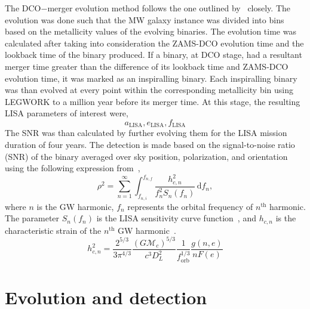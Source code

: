 \documentclass[journal, twocolumn]{IEEEtran}
\newcommand{\semaxis}[1]{a_{\text{#1}}}
\newcommand{\ecc}[1]{e_\text{#1}}
\begin{document}
    The DCO$-$merger evolution method follows the one outlined by~\cite{wagg2021gravitational} closely.
    The evolution was done such that the MW galaxy instance was divided into bins based on the metallicity values of the evolving binaries.
    The evolution time was calculated after taking into consideration the ZAMS-DCO evolution time and the lookback time of the binary produced.
    If a binary, at DCO stage, had a resultant merger time greater than the difference of its lookback time and ZAMS-DCO evolution time, it was marked as an inspiralling binary.
    Each inspiralling binary was than evolved at every point within the corresponding metallicity bin using LEGWORK to a million year before its merger time.
    At this stage, the resulting LISA parameters of interest were,
    \begin{equation}%
        \semaxis{LISA}, \ecc{LISA}, f_{\text{LISA}}
        \label{eq:lisa_parameter_names}
    \end{equation}%
    The SNR was than calculated by further evolving them for the LISA mission duration of four years.
    The detection is made based on the signal-to-noise ratio (SNR) of the binary averaged over sky position, polarization, and orientation using the following expression from~\cite{Finn2000},
    \begin{equation}
        \rho^2 = \sum_{n=1}^{\infty}\int_{f_{n, i}}^{f_{n, f}}\frac{h_{c, n}^2}{f_n^2 S_n(f_n)}\,\text{d}f_n,
        \label{eq:snr_equation}
    \end{equation}
    where $n$ is the GW harmonic, $f_n$ represents the orbital frequency of $n^\text{th}$ harmonic.
    The parameter $S_n(f_n)$ is the LISA sensitivity curve function~\cite{Robson2019}, and $h_{c, n}$ is the characteristic strain of the $n^\text{th}$ GW harmonic~\cite{Barack2004}.
    \begin{equation}
        h_{c,n}^2 = \frac{2^{5/3}}{3\pi^{4/3}}\frac{(G\mathcal{M}_c)^{5/3}}{c^3 D_L^2}\frac{1}{f_\text{orb}^{1/3}}\frac{g(n, e)}{nF(e)}
        \label{eq:characteristic_strain}
    \end{equation}


    \section{Evolution and detection}
    \label{sec:evolution-and-detection}
\end{document}
